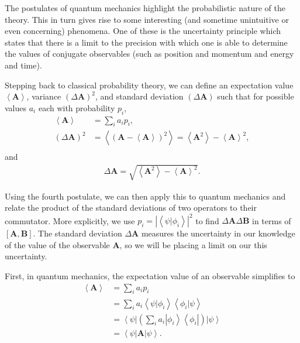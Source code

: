 \documentclass[11pt]{article} %
\newcommand{\bra}[1]{\left\langle #1 \right|}
\newcommand{\ket}[1]{\left|#1\right\rangle}
\newcommand{\braket}[2]{\left\langle#1 |  #2\right\rangle}
\begin{document}
The postulates of quantum mechanics highlight the probabilistic nature of the theory. This in turn gives rise to some interesting (and sometime unintuitive or even concerning) phenomena. One of these is the uncertainty principle which states that there is a limit to the precision with which one is able to determine the values of conjugate observables (such as position and momentum and energy and time).

Stepping back to classical probability theory, we can define an expectation value $\left<\textbf{A}\right>$, variance $(\Delta\textbf{A})^2$, and standard deviation $(\Delta\textbf{A})$ such that for possible values $a_i$ each with probability $p_i$,
\begin{align}
    \left<\textbf{A}\right> &= \sum_ia_ip_i,\\
    (\Delta\textbf{A})^2 &= \left<\left(\textbf{A}-\left<\textbf{A}\right>\right)^2\right> = \left<\textbf{A}^2\right> - \left<\textbf{A}\right>^2,\\
\end{align}
and
\begin{align}
    \Delta\textbf{A} = \sqrt{\left<\textbf{A}^2\right> - \left<\textbf{A}\right>^2}.
\end{align}

Using the fourth postulate, we can then apply this to quantum mechanics and relate the product of the standard deviations of two operators to their commutator. More explicitly, we use $p_i = \left|\braket{\psi}{\phi_i}\right|^2$ to find $\Delta\textbf{A}\Delta\textbf{B}$ in terms of $[\textbf{A},\textbf{B}]$. The standard deviation $\Delta\textbf{A}$ measures the uncertainty in our knowledge of the value of the observable \textbf{A}, so we will be placing a limit on our this uncertainty.

First, in quantum mechanics, the expectation value of an observable simplifies to
\begin{align}
    \left<\textbf{A}\right> &= \sum_ia_ip_i\nonumber\\
    &= \sum_ia_i\braket{\psi}{\phi_i}\braket{\phi_i}{\psi}\\
    &= \bra{\psi}\left(\sum_ia_i\ket{\phi_i}\bra{\phi_i}\right)\ket{\psi}\nonumber\\
    &= \bra{\psi}\textbf{A}\ket{\psi}.
\end{align}
\end{document}
